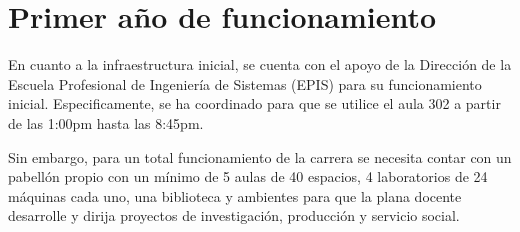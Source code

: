 \section{Primer año de funcionamiento}

En cuanto a la infraestructura inicial, se cuenta con el apoyo de la Dirección de la Escuela Profesional de Ingeniería de Sistemas (EPIS) para su funcionamiento inicial. Especificamente, se ha coordinado para que se utilice el aula 302 a partir de las 1:00pm hasta las 8:45pm.

Sin embargo, para un total funcionamiento de la carrera se necesita contar con un pabellón propio con un mínimo de 5 aulas de 40 espacios, 4 laboratorios de 24 máquinas cada uno, una biblioteca y ambientes para que la plana docente desarrolle y dirija proyectos de investigación, producción y servicio social.

